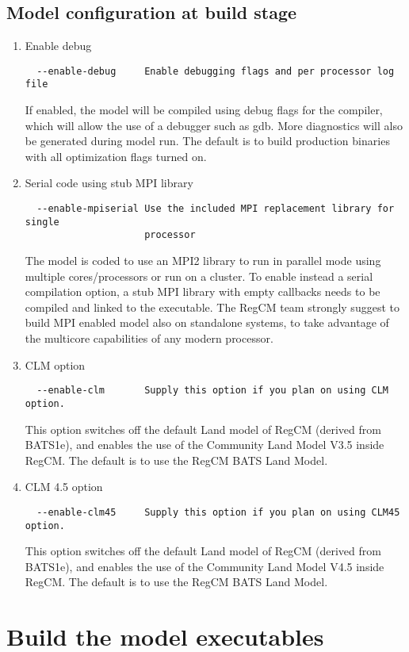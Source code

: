 \subsection{Model configuration at build stage}
\label{modconf}

\begin{enumerate}
\item Enable debug
\begin{Verbatim}
  --enable-debug     Enable debugging flags and per processor log file
\end{Verbatim}
If enabled, the model will be compiled using debug flags for the compiler,
which will allow the use of a debugger such as gdb. More diagnostics will
also be generated during model run.
The default is to build production binaries with all optimization flags
turned on.

\item Serial code using stub MPI library
\begin{Verbatim}
  --enable-mpiserial Use the included MPI replacement library for single
                     processor
\end{Verbatim}
The model is coded to use an MPI2 library to run in parallel mode using
multiple cores/processors or run on a cluster. To enable instead a serial
compilation option, a stub MPI library with empty callbacks needs to be
compiled and linked to the executable.
The RegCM team strongly suggest to build MPI enabled model also on standalone
systems, to take advantage of the multicore capabilities of any modern
processor.
\item CLM option
\begin{Verbatim}
  --enable-clm       Supply this option if you plan on using CLM option.
\end{Verbatim}
This option switches off the default Land model of RegCM (derived from BATS1e),
and enables the use of the Community Land Model V3.5 inside RegCM. The default
is to use the RegCM BATS Land Model.
\item CLM 4.5 option
\begin{Verbatim}
  --enable-clm45     Supply this option if you plan on using CLM45 option.
\end{Verbatim}
This option switches off the default Land model of RegCM (derived from BATS1e),
and enables the use of the Community Land Model V4.5 inside RegCM. The default
is to use the RegCM BATS Land Model.
\end{enumerate}

\section{Build the model executables}


